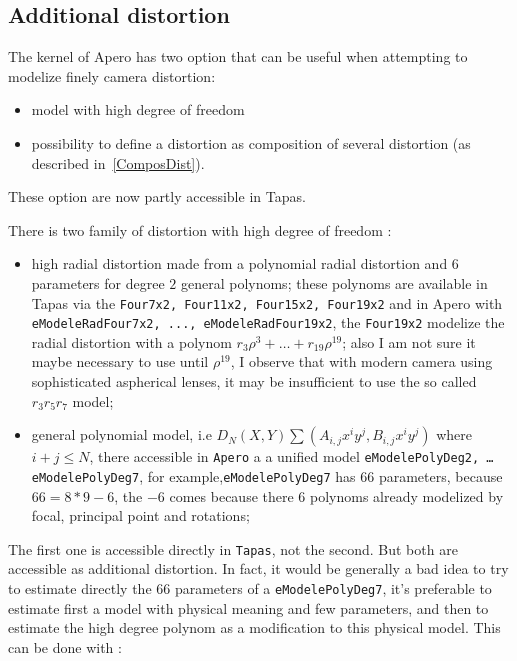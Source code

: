
\subsection{Additional distortion}

The kernel of Apero has two option that can be useful when attempting to modelize finely camera distortion:

\begin{itemize}
   \item model with high degree of freedom
   \item possibility to define a distortion as composition of several distortion (as described in~\ref{ComposDist}).
\end{itemize}

These option are now partly accessible in Tapas.

There is two family of distortion with high degree of freedom :


\begin{itemize}
   \item high radial distortion made from a polynomial radial distortion and $6$ parameters for degree $2$
         general polynoms; these polynoms are available in Tapas via the {\tt Four7x2, Four11x2, Four15x2, Four19x2}
         and in Apero with {\tt eModeleRadFour7x2, ..., eModeleRadFour19x2}, the {\tt Four19x2} modelize the radial
         distortion with a polynom $r_3 \rho^3 +\dots + r_{19} \rho^{19}$; also I am not sure it maybe necessary to
         use until $ \rho^{19}$, I observe that with modern camera using sophisticated aspherical lenses, it may be
         insufficient to use the so called $r_3 r_5 r_7$ model;


   \item general polynomial model, i.e $D_N(X,Y) \sum (A_{i,j} x^iy^j,B_{i,j} x^iy^j)$  where $i+j\leq N$,
         there accessible in {\tt Apero} a a unified model {\tt eModelePolyDeg2, \dots eModelePolyDeg7},
         for example,{\tt eModelePolyDeg7} has $66$ parameters, because $66=8*9-6$, the $-6$ comes because
         there $6$ polynoms already modelized by focal, principal point and rotations;
\end{itemize}

The first one is accessible directly in {\tt Tapas}, not the second. But both are accessible as additional distortion.
In fact, it would be generally a bad idea to try to estimate directly the $66$ parameters of a {\tt eModelePolyDeg7}, it's
preferable to estimate first a model with physical meaning and few parameters, and then to estimate the high degree polynom as a modification to this physical model. This can be done with :

